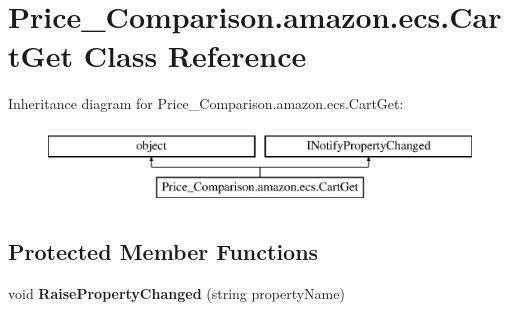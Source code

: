 \hypertarget{class_price___comparison_1_1amazon_1_1ecs_1_1_cart_get}{\section{Price\-\_\-\-Comparison.\-amazon.\-ecs.\-Cart\-Get Class Reference}
\label{class_price___comparison_1_1amazon_1_1ecs_1_1_cart_get}
}


 


Inheritance diagram for Price\-\_\-\-Comparison.\-amazon.\-ecs.\-Cart\-Get\-:\begin{figure}[H]
\begin{center}
\leavevmode
\includegraphics[height=2.000000cm]{class_price___comparison_1_1amazon_1_1ecs_1_1_cart_get}
\end{center}
\end{figure}
\subsection*{Protected Member Functions}
\begin{DoxyCompactItemize}
\item 
\hypertarget{class_price___comparison_1_1amazon_1_1ecs_1_1_cart_get_a1e05b521a8f754c62e353949d498966c}{void {\bfseries Raise\-Property\-Changed} (string property\-Name)}\label{class_price___comparison_1_1amazon_1_1ecs_1_1_cart_get_a1e05b521a8f754c62e353949d498966c}

\end{DoxyCompactItemize}
